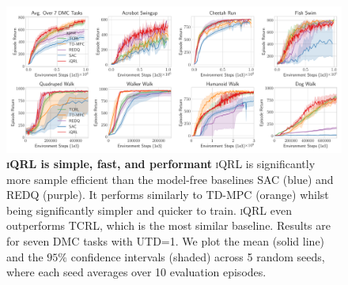 \documentclass{article}
\theoremstyle{plain}
\theoremstyle{definition}
\theoremstyle{remark}
\newcommand{\our}{\textsc{iQRL}\xspace}
\begin{document}
\begin{figure}[ht]
\vskip 0.2in
\begin{center}
\centerline{\includegraphics[width=1.0\textwidth]{./figs/baselines_comparison.pdf}}
\caption{\textbf{\our is simple, fast, and performant} \our is significantly more sample efficient than the model-free baselines SAC (blue) and REDQ (purple). It performs similarly to TD-MPC (orange) whilst being significantly simpler and quicker to train. \our even outperforms TCRL, which is the most similar baseline. Results are for seven DMC tasks with UTD=1. We plot the mean (solid line) and the $95\%$ confidence intervals (shaded) across 5 random seeds, where each seed averages over 10 evaluation episodes.}

\label{fig:normalization_improves_sample_efficiency}
\end{center}
\vskip -0.2in
\end{figure}
\end{document}

